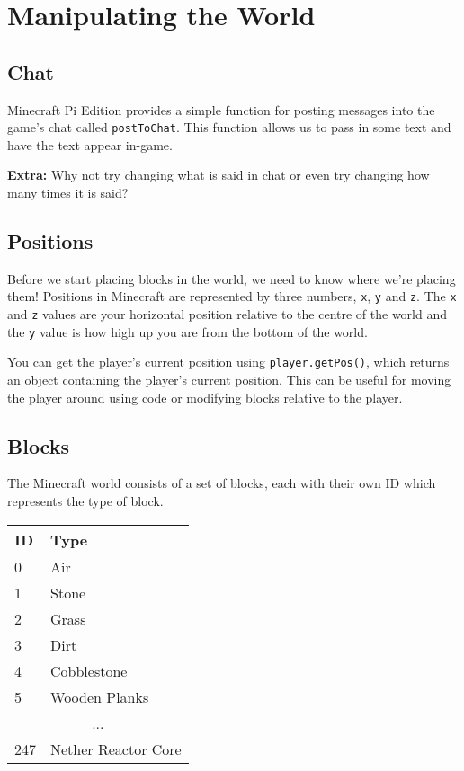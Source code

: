\section{Manipulating the World}
\label{sec:manipulating_the_world}

	\subsection{Chat}

		Minecraft Pi Edition provides a simple function for posting messages into the game's chat called \texttt{postToChat}. This function allows us to pass in some text and have the text appear in-game.

		

		\textbf{Extra:} Why not try changing what is said in chat or even try changing how many times it is said?

	\subsection{Positions}

		Before we start placing blocks in the world, we need to know where we're placing them! Positions in Minecraft are represented by three numbers, \texttt{x}, \texttt{y} and \texttt{z}. The \texttt{x} and \texttt{z} values are your horizontal position relative to the centre of the world and the \texttt{y} value is how high up you are from the bottom of the world.

		You can get the player's current position using \texttt{player.getPos()}, which returns an object containing the player's current position. This can be useful for moving the player around using code or modifying blocks relative to the player.

		

	\subsection{Blocks}

		The Minecraft world consists of a set of blocks, each with their own ID which represents the type of block.

		\begin{center}
			\begin{tabular}{ l l }
				\hline
				ID & Type \\
				\hline
				\hline
				0 & Air \\
				1 & Stone \\
				2 & Grass \\
				3 & Dirt \\
				4 & Cobblestone \\
				5 & Wooden Planks \\
				\multicolumn{2}{c}{...} \\
				247 & Nether Reactor Core \\
				\hline
			\end{tabular}
		\end{center}

